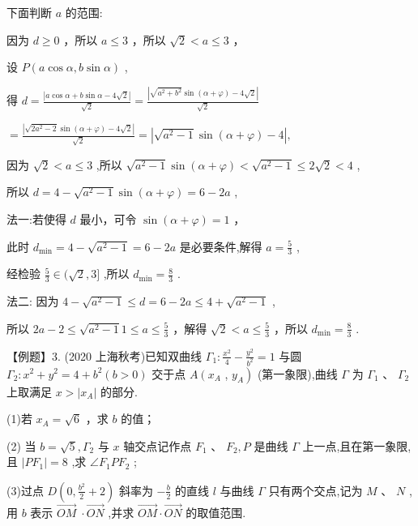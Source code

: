 \documentclass[10pt]{article}
\begin{document}
下面判断 \(a\) 的范围:

因为 \(d \geq  0\) ，所以 \(a \leq  3\) ，所以 \(\sqrt{2} < a \leq  3\) ，

设 \(P\left( {a\cos \alpha ,b\sin \alpha }\right)\) ,

得 \(d = \frac{\left| a\cos \alpha  + b\sin \alpha  - 4\sqrt{2}\right| }{\sqrt{2}} = \frac{\left| \sqrt{{a}^{2} + {b}^{2}}\sin \left( \alpha  + \varphi \right)  - 4\sqrt{2}\right| }{\sqrt{2}}\)

\(= \frac{\left| \sqrt{2{a}^{2} - 2}\sin \left( \alpha  + \varphi \right)  - 4\sqrt{2}\right| }{\sqrt{2}} = \left| {\sqrt{{a}^{2} - 1}\sin \left( {\alpha  + \varphi }\right)  - 4}\right| ,\)

因为 \(\sqrt{2} < a \leq  3\) ,所以 \(\sqrt{{a}^{2} - 1}\sin \left( {\alpha  + \varphi }\right)  < \sqrt{{a}^{2} - 1} \leq  2\sqrt{2} < 4\) ,

所以 \(d = 4 - \sqrt{{a}^{2} - 1}\sin \left( {\alpha  + \varphi }\right)  = 6 - {2a}\) ,

法一:若使得 \(d\) 最小，可令 \(\sin \left( {\alpha  + \varphi }\right)  = 1\) ，

此时 \({d}_{\min } = 4 - \sqrt{{a}^{2} - 1} = 6 - {2a}\) 是必要条件,解得 \(a = \frac{5}{3}\) ,

经检验 \(\frac{5}{3} \in  (\sqrt{2},3\rbrack\) ,所以 \({d}_{\min } = \frac{8}{3}\) .

法二: 因为 \(4 - \sqrt{{a}^{2} - 1} \leq  d = 6 - {2a} \leq  4 + \sqrt{{a}^{2} - 1}\) ,

所以 \({2a} - 2 \leq  \sqrt{{a}^{2} - 1}1 \leq  a \leq  \frac{5}{3}\) ，解得 \(\sqrt{2} < a \leq  \frac{5}{3}\) ，所以 \({d}_{\min } = \frac{8}{3}\) .

【例题】3. (2020 上海秋考)已知双曲线 \({\Gamma }_{1} : \frac{{x}^{2}}{4} - \frac{{y}^{2}}{{b}^{2}} = 1\) 与圆 \({\Gamma }_{2} : {x}^{2} + {y}^{2} = 4 + {b}^{2}\left( {b > 0}\right)\) 交于点 \(A\left( {x}_{A}\right.\) , \(\left. {y}_{A}\right)\) (第一象限),曲线 \(\Gamma\) 为 \({\Gamma }_{1}\text{ 、 }{\Gamma }_{2}\) 上取满足 \(x > \left| {x}_{A}\right|\) 的部分.

(1)若 \({x}_{A} = \sqrt{6}\) ，求 \(b\) 的值；

(2) 当 \(b = \sqrt{5},{\Gamma }_{2}\) 与 \(x\) 轴交点记作点 \({F}_{1}\text{ 、 }{F}_{2},P\) 是曲线 \(\Gamma\) 上一点,且在第一象限,且 \(\left| {P{F}_{1}}\right|  = 8\) ,求 \(\angle {F}_{1}P{F}_{2}\) ;

(3)过点 \(D\left( {0,\frac{{b}^{2}}{2} + 2}\right)\) 斜率为 \(- \frac{b}{2}\) 的直线 \(l\) 与曲线 \(\Gamma\) 只有两个交点,记为 \(M\text{ 、 }N\) ,用 \(b\) 表示 \(\overrightarrow{OM} \; \cdot  \overrightarrow{ON}\) ,并求 \(\overrightarrow{OM} \cdot  \overrightarrow{ON}\) 的取值范围.
\end{document}

